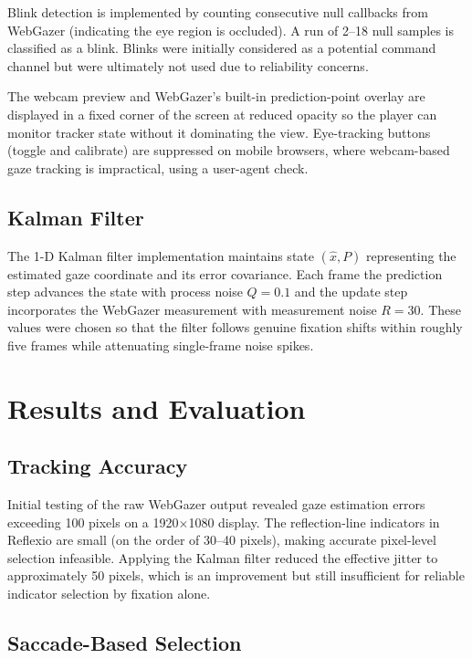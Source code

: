 \documentclass[11pt,twocolumn]{article}
\begin{document}
Blink detection is implemented by counting consecutive null callbacks from
WebGazer (indicating the eye region is occluded). A run of 2--18 null samples
is classified as a blink. Blinks were initially considered as a potential
command channel but were ultimately not used due to reliability concerns.

The webcam preview and WebGazer's built-in prediction-point overlay are
displayed in a fixed corner of the screen at reduced opacity so the player can
monitor tracker state without it dominating the view. Eye-tracking buttons
(toggle and calibrate) are suppressed on mobile browsers, where webcam-based
gaze tracking is impractical, using a user-agent check.

\subsection{Kalman Filter}

The 1-D Kalman filter implementation maintains state $(\hat{x}, P)$ representing
the estimated gaze coordinate and its error covariance. Each frame the
prediction step advances the state with process noise $Q = 0.1$ and the
update step incorporates the WebGazer measurement with measurement noise
$R = 30$. These values were chosen so that the filter follows genuine fixation
shifts within roughly five frames while attenuating single-frame noise spikes.

\section{Results and Evaluation}
\label{sec:results}

\subsection{Tracking Accuracy}

Initial testing of the raw WebGazer output revealed gaze estimation errors
exceeding 100 pixels on a 1920$\times$1080 display. The reflection-line
indicators in Reflexio are small (on the order of 30--40 pixels), making
accurate pixel-level selection infeasible. Applying the Kalman filter reduced
the effective jitter to approximately 50 pixels, which is an improvement but
still insufficient for reliable indicator selection by fixation alone.

\subsection{Saccade-Based Selection}
\end{document}

